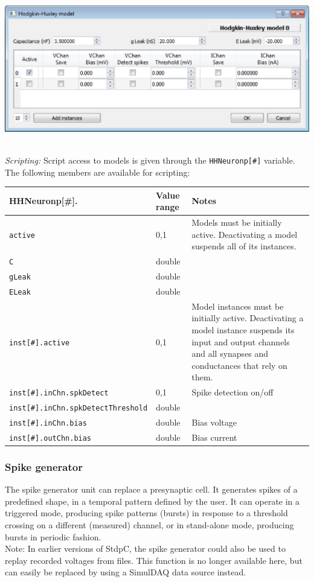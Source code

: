 \documentclass{article}
\begin{document}
\noindent
\parbox{\textwidth}{
	\includegraphics[scale=0.5]{HHmodel}
} \\[0.2cm]

\noindent
\emph{Scripting:} Script access to models is given through the \texttt{HHNeuronp[\#]} variable.
The following members are available for scripting: \\
\begin{tabularx}{\linewidth}{|ll|X|}
	\hline
	{\bf HHNeuronp[\#].\textvisiblespace} & {\bf Value range} & {\bf Notes} \\
	\hline
	\texttt{active} & 0,1 & Models must be initially active. Deactivating a model suspends all of
	its instances. \\
	\texttt{C} & double & \\
	\texttt{gLeak} & double & \\
	\texttt{ELeak} & double & \\
	\texttt{inst[\#].active} & 0,1 & Model instances must be initially active. Deactivating a model instance
	suspends its input and output channels and all synapses and conductances that rely on them. \\
	\texttt{inst[\#].inChn.spkDetect} & 0,1 & Spike detection on/off \\
	\texttt{inst[\#].inChn.spkDetectThreshold} & double & \\
	\texttt{inst[\#].inChn.bias} & double & Bias voltage \\
	\texttt{inst[\#].outChn.bias} & double & Bias current \\
	\hline
\end{tabularx}

\subsubsection{Spike generator} \label{spikegen}
The spike generator unit can replace a presynaptic cell. It generates spikes of a 
predefined shape, in a temporal pattern defined by the user. It can operate in
a triggered mode, producing spike patterns (bursts) in response to a threshold crossing
on a different (measured) channel, or in stand-alone mode, producing bursts in
periodic fashion. \\
Note: In earlier versions of StdpC, the spike generator could also be used to
replay recorded voltages from files. This function is no longer available
here, but can easily be replaced by using a SimulDAQ data source instead.
\end{document}

